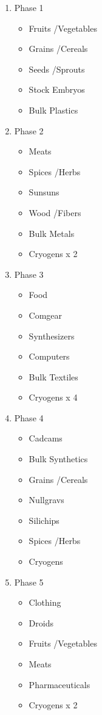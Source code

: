 \begin{enumerate}
 \item Phase 1
 \begin{itemize}
  \item Fruits \slash Vegetables
  \item Grains \slash Cereals
  \item Seeds \slash Sprouts
  \item Stock Embryos
  \item Bulk Plastics
 \end{itemize}

 \item Phase 2
 \begin{itemize}
  \item Meats
  \item Spices \slash Herbs
  \item Sunsuns
  \item Wood \slash Fibers
  \item Bulk Metals
  \item Cryogens x 2
 \end{itemize}

 \item Phase 3
 \begin{itemize}
  \item Food
  \item Comgear
  \item Synthesizers
  \item Computers
  \item Bulk Textiles
  \item Cryogens x 4
 \end{itemize}

 \item Phase 4
 \begin{itemize}
  \item Cadcams
  \item Bulk Synthetics
  \item Grains \slash Cereals
  \item Nullgravs
  \item Silichips
  \item Spices \slash Herbs
  \item Cryogens
 \end{itemize}

 \item Phase 5
 \begin{itemize}
  \item Clothing
  \item Droids
  \item Fruits \slash Vegetables
  \item Meats
  \item Pharmaceuticals
  \item Cryogens x 2
 \end{itemize}


\end{enumerate}
